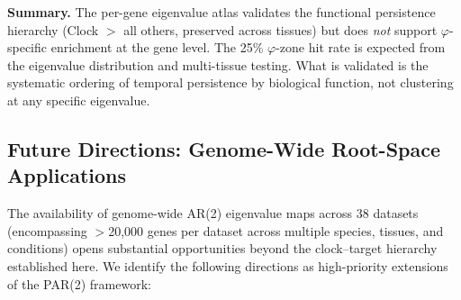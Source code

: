 \documentclass[11pt,letterpaper]{article}
\begin{document}
\textbf{Summary.} The per-gene eigenvalue atlas validates the functional persistence hierarchy (Clock $>$ all others, preserved across tissues) but does \textit{not} support $\varphi$-specific enrichment at the gene level. The 25\% $\varphi$-zone hit rate is expected from the eigenvalue distribution and multi-tissue testing. What is validated is the systematic ordering of temporal persistence by biological function, not clustering at any specific eigenvalue.

\subsection*{Future Directions: Genome-Wide Root-Space Applications}

The availability of genome-wide AR(2) eigenvalue maps across 38 datasets (encompassing $>$20,000 genes per dataset across multiple species, tissues, and conditions) opens substantial opportunities beyond the clock--target hierarchy established here. We identify the following directions as high-priority extensions of the PAR(2) framework:
\end{document}
